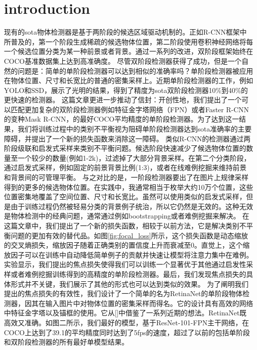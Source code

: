 \documentclass{ctexart}
\begin{document}
\section{introduction}
现有的sota物体检测器是基于两阶段的候选区域驱动机制的。正如R-CNN框架中所普及的，第一个阶段生成稀疏的候选物体位置，第二阶段使用卷积神经网络将每一个候选位置分类为某一种前景或者背景。通过一系列的改进，双阶段框架始终在COCO基准数据集上达到高准确度。\newline
尽管双阶段检测器获得了成功，但是一个自然的问题是：简单的单阶段检测器可以达到相似的准确率吗？单阶段检测器被应用在物体位置、尺寸和长宽比的普通的密集采样上。近期单阶段检测器的工作，例如YOLO和SSD，展示了光明的结果，得到了精度为sota双阶段检测器10\%到40\%的更快速的检测器。\newline
这篇文章更进一步推动了信封：开创性地，我们提出了一个可以匹配更加复杂的双阶段检测器例如特征金字塔网络（FPN）或者Faster R-CNN的变种Mask R-CNN，的最好COCO平均精度的单阶段检测器。为了达到这一结果，我们将训练过程中的类别不平衡视为阻碍单阶段检测器达到sota准确率的主要障碍，并提出了一个新的损失函数来消除这一障碍。\newline
类似R-CNN的检测器通过两阶段级联和启发式采样来类别不平衡问题。候选阶段快速减少了候选物体位置的数量至一个较少的数量(例如1-2k)，过滤掉了大部分背景采样。在第二个分类阶段，通过启发式采样，例如固定的前景背景比例(1:3)，或者在线难例挖掘来维持前景和背景间的可管理平衡。\newline
与之对比的是，一阶段检测器要出了在图片上规律采样得到的更多的候选物体位置。在实践中，我通常相当于枚举大约10万个位置，这些位置密集地覆盖了空间位置、尺寸和长宽比。虽然可以使用类似的启发式采样，但是由于训练过程仍然被轻易分类的背景例子统治，所以它仍然是无效的。这种无效是物体检测中的经典问题，通常通过例如bootstrapping或者难例挖掘来解决。\newline
在这篇文章中，我们提出了一个新的损失函数，相较于以前方法，它是解决类别不平衡问题的更加有效的替代品。如图\ref{fig:focal_loss}所示，这个损失函数是动态缩放的交叉熵损失，缩放因子随着正确类别的置信度上升而衰减至0。直觉上，这个缩放因子可以在训练中自动降低简单例子的贡献并快速让模型将注意力集中在难例。实验显示，我们提出的焦点损失使得我们可以训练一个显著优于其他通过启发性采样或者难例挖掘训练得到的高精度的单阶段检测器。最后，我们发现焦点损失的具体形式并不关键，我们展示了其他的形式也可以达到类似的效果。\newline
为了阐明我们提出的焦点损失的有效性，我们设计了一个简单的名为RetinaNet的单阶段物体检测器，因其在输入图片中对物体位置的密集采样而得名。它的设计具有高效的网络中特征金字塔以及锚框的使用。它从[]中借鉴了一系列近期的想法。RetinaNet既高效又准确。如图二所示，我们最好的模型，基于ResNet-101-FPN主干网络，在COCO上达到了39.1的平均精度同时达到了5fps的速度，超过了以前的包括单阶段和双阶段检测器的所有最好单模型结果。
\end{document}
